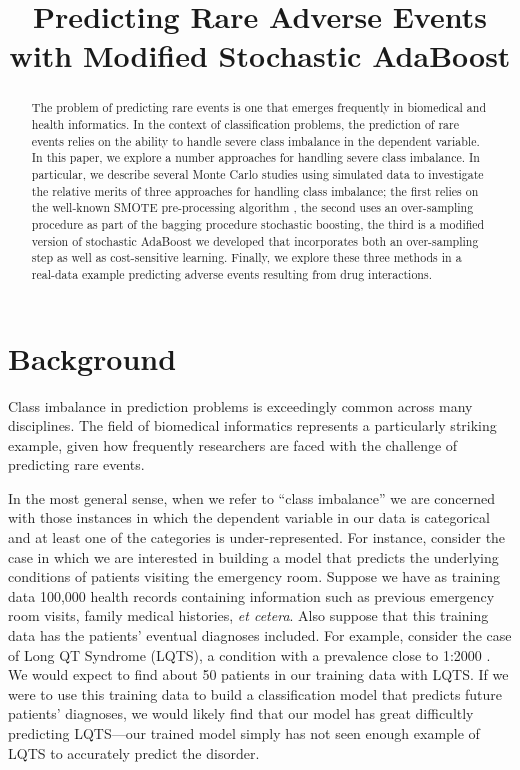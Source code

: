 \documentclass[10pt]{article}
\title{\fontsize{14}{14} Predicting Rare Adverse Events with Modified Stochastic AdaBoost}
\author{}
\date{}
\begin{document}
\maketitle

\begin{abstract}
The problem of predicting rare events is one that emerges frequently in biomedical and health informatics. In the context of classification problems, the prediction of rare events relies on the ability to handle severe class imbalance in the dependent variable. In this paper, we explore a number approaches for handling severe class imbalance. In particular, we describe several Monte Carlo studies using simulated data to investigate the relative merits of three approaches for handling class imbalance; the first relies on the well-known SMOTE pre-processing algorithm \cite{chawla02}, the second uses an over-sampling procedure as part of the bagging procedure stochastic boosting, the third is a modified version of stochastic AdaBoost we developed that incorporates both an over-sampling step as well as cost-sensitive learning. Finally, we explore these three methods in a real-data example predicting adverse events resulting from drug interactions. 
\end{abstract}

\section{Background}

Class imbalance in prediction problems is exceedingly common across many disciplines. The field of biomedical informatics represents a particularly striking example, given how frequently researchers are faced with the challenge of predicting rare events. 

In the most general sense, when we refer to ``class imbalance'' we are concerned with those instances in which the dependent variable in our data is categorical and at least one of the categories is under-represented. For instance, consider the case in which we are interested in building a model that predicts the underlying conditions of patients visiting the emergency room. Suppose we have as training data 100,000 health records containing information such as previous emergency room visits, family medical histories, \textit{et cetera}. Also suppose that this training data has the patients' eventual diagnoses included. For example, consider the case of Long QT Syndrome (LQTS), a condition with a prevalence close to 1:2000 \cite{schwartz09}. We would expect to find about 50 patients in our training data with LQTS. If we were to use this training data to build a classification model that predicts future patients' diagnoses, we would likely find that our model has great difficultly predicting LQTS---our trained model simply has not seen enough example of LQTS to accurately predict the disorder. 
\end{document}
